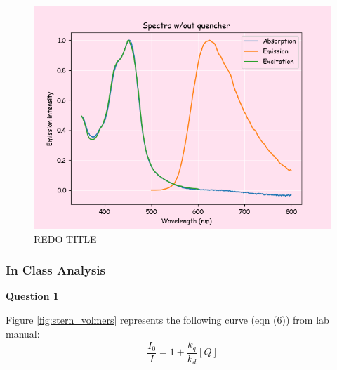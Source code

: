\begin{figure}[H]
    \centering
    \includegraphics[width = 0.7\linewidth]{part1_noq.png}
    \caption{REDO TITLE}
    \label{fig:enter-label}
\end{figure}
\subsubsection*{In Class Analysis}
\textbf{Question 1} 


Figure \ref{fig:stern_volmers} represents the following curve (eqn (6)) from lab manual\autocite{lab_manual}:
\begin{equation*}
    \frac{I_0}{I} = 1 + \frac{k_q}{k_d}[Q]
\end{equation*}

